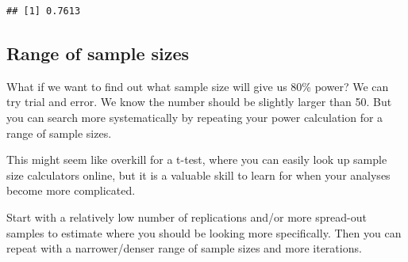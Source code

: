 \documentclass[
  oneside]{book}
\newenvironment{Shaded}{\begin{snugshade}}{\end{snugshade}}
\newcommand{\AttributeTok}[1]{\textcolor[rgb]{0.77,0.63,0.00}{#1}}
\newcommand{\CommentTok}[1]{\textcolor[rgb]{0.56,0.35,0.01}{\textit{#1}}}
\newcommand{\ControlFlowTok}[1]{\textcolor[rgb]{0.13,0.29,0.53}{\textbf{#1}}}
\newcommand{\DecValTok}[1]{\textcolor[rgb]{0.00,0.00,0.81}{#1}}
\newcommand{\FloatTok}[1]{\textcolor[rgb]{0.00,0.00,0.81}{#1}}
\newcommand{\FunctionTok}[1]{\textcolor[rgb]{0.00,0.00,0.00}{#1}}
\newcommand{\NormalTok}[1]{#1}
\newcommand{\OtherTok}[1]{\textcolor[rgb]{0.56,0.35,0.01}{#1}}
\newcommand{\SpecialCharTok}[1]{\textcolor[rgb]{0.00,0.00,0.00}{#1}}
\newcommand{\StringTok}[1]{\textcolor[rgb]{0.31,0.60,0.02}{#1}}
\begin{document}
\begin{verbatim}
## [1] 0.7613
\end{verbatim}

\hypertarget{range-of-sample-sizes}{%
\subsection{Range of sample sizes}\label{range-of-sample-sizes}}

What if we want to find out what sample size will give us 80\% power? We can try trial and error. We know the number should be slightly larger than 50. But you can search more systematically by repeating your power calculation for a range of sample sizes.

\begin{info}
This might seem like overkill for a t-test, where you can easily look up sample size calculators online, but it is a valuable skill to learn for when your analyses become more complicated.

\end{info}

Start with a relatively low number of replications and/or more spread-out samples to estimate where you should be looking more specifically. Then you can repeat with a narrower/denser range of sample sizes and more iterations.

\begin{Shaded}
\end{Shaded}
\end{document}
